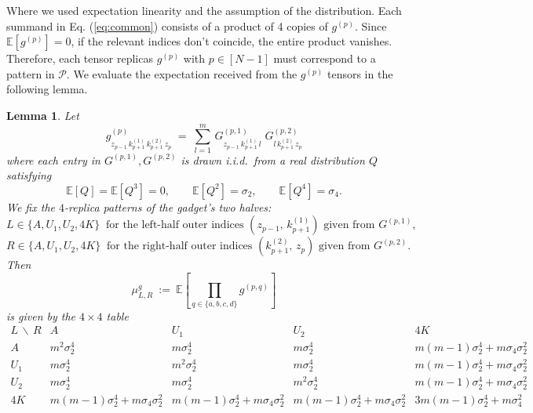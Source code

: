 \documentclass[12pt,a4paper]{article}
\newtheorem{lemma}[theorem]{Lemma}
\begin{document}
Where we used expectation linearity and the assumption of the distribution.
Each summand in Eq. (\ref{eq:common}) consists of a product of 4 copies of $g^{(p)}$. Since $\mathbb{E}[g^{(p)}]=0$, if the relevant indices don't coincide, the entire product vanishes. Therefore, each tensor replicas $g^{(p)}$ with $p\in [N-1]$  must correspond to a pattern in $\mathcal{P}$.  We evaluate the expectation received from the $g^{(p)}$  tensors in the following lemma.
\begin{lemma}\label{lem:mu-g}
Let
\[
g^{(p)}_{z_{p-1}\,k^{(1)}_{p+1}\,k^{(2)}_{p+1}\,z_{p}}
\;=\;
\sum_{l=1}^{m}\,
G^{(p,1)}_{z_{p-1}\,k^{(1)}_{p+1}\,l}\;
G^{(p,2)}_{l\,k^{(2)}_{p+1}\,z_{p}}
\]
where each entry in  $G^{(p,1)},G^{(p,2)}$  is drawn i.i.d.\ from
a real distribution $Q$ satisfying
\[
\mathbb{E}[Q]=\mathbb{E}[Q^{3}]=0,\qquad
\mathbb{E}[Q^{2}]=\sigma_{2},\qquad
\mathbb{E}[Q^{4}]=\sigma_{4}.
\]
We fix the $4$-replica patterns of the gadget's two halves:
\[
L\in\{A,U_{1},U_{2},4K\}\ \text{ for the left-half outer indices }(z_{p-1},\,k^{(1)}_{p+1}) \text{ given from $G^{(p,1)}$},
\]
\[
R\in\{A,U_{1},U_{2},4K\}\ \text{ for the right-half outer indices }(k^{(2)}_{p+1},\,z_{p})\text{ given from $G^{(p,2)}$}.
\]
Then
\[
\mu^{g}_{L,R}\ :=\ \mathbb{E}\!\left[\prod_{q\in\{a,b,c,d\}}g^{(p,q)}\right]
\]
is given by the $4\times 4$ table
\[
\renewcommand{\arraystretch}{1.4}
\begin{array}{c|cccc}
L\,\backslash\,R & A & U_{1} & U_{2} & 4K \\\hline
A     & m^{2}\sigma_{2}^{4}
      & m\sigma_{2}^{4}
      & m\sigma_{2}^{4}
      & m(m-1)\sigma_{2}^{4}+m\sigma_{4}\sigma_{2}^{2} \\
U_{1} & m\sigma_{2}^{4}
      & m^{2}\sigma_{2}^{4}
      & m\sigma_{2}^{4}
      & m(m-1)\sigma_{2}^{4}+m\sigma_{4}\sigma_{2}^{2} \\
U_{2} & m\sigma_{2}^{4}
      & m\sigma_{2}^{4}
      & m^{2}\sigma_{2}^{4}
      & m(m-1)\sigma_{2}^{4}+m\sigma_{4}\sigma_{2}^{2} \\
4K    & m(m-1)\sigma_{2}^{4}+m\sigma_{4}\sigma_{2}^{2}
      & m(m-1)\sigma_{2}^{4}+m\sigma_{4}\sigma_{2}^{2}
      & m(m-1)\sigma_{2}^{4}+m\sigma_{4}\sigma_{2}^{2}
      & 3m(m-1)\sigma_{2}^{4}+m\sigma_{4}^{2} \\
\end{array}
\]
\end{lemma}
\end{document}
